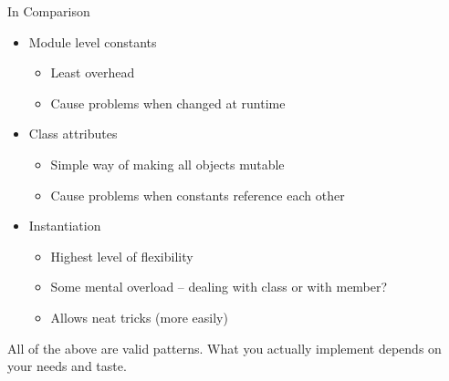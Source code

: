 
\begin{frame}{In Comparison}
%
\begin{itemize}
\item Module level constants
	\begin{itemize}
	\item Least overhead
	\item Cause problems when changed at runtime
	\end{itemize}
\item Class attributes
	\begin{itemize}
	\item Simple way of making all objects mutable
	\item Cause problems when constants reference each other
	\end{itemize}
\item Instantiation
	\begin{itemize}
	\item Highest level of flexibility
	\item Some mental overload -- dealing with class or with member?
	\item Allows neat tricks (more easily)
	\end{itemize}
\end{itemize}
%
\begin{hintbox}
\footnotesize
All of the above are valid patterns. What you actually implement depends on your needs and taste.
\end{hintbox}
%
\end{frame}


